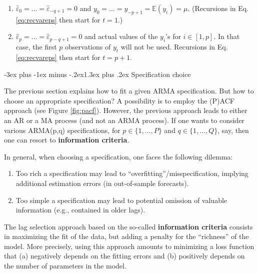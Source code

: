 \documentclass[
  11pt,
]{book}
\makeatletter
\providecommand{\tightlist}{%
  \setlength{\itemsep}{0pt}\setlength{\parskip}{0pt}}
\renewcommand\section{\@startsection{section}{1}{\z@}
  {-3ex plus -1ex minus -.2ex}{1.3ex plus .2ex}
  {\normalfont\Large\bfseries\color{TextbookInk}}}
\theoremstyle{definition}
\theoremstyle{definition}
\theoremstyle{definition}
\theoremstyle{definition}
\theoremstyle{remark}
\makeatother
\begin{document}
\begin{enumerate}
\def\labelenumi{\alph{enumi}.}
\tightlist
\item
  \(\hat\varepsilon_0=\dots=\hat\varepsilon_{-q+1}=0\) and \(y_{0}=\dots=y_{-p+1}=\mathbb{E}(y_i)=\mu\). (Recursions in Eq. \eqref{eq:recvareps} then start for \(t=1\).)
\item
  \(\hat\varepsilon_p=\dots=\hat\varepsilon_{p-q+1}=0\) and actual values of the \(y_{i}\)'s for \(i \in [1,p]\). In that case, the first \(p\) observations of \(y_t\) will not be used. Recursions in Eq. \eqref{eq:recvareps} then start for \(t=p+1\).
\end{enumerate}

\section{Specification choice}\label{specification-choice}

The previous section explains how to fit a given ARMA specification. But how to choose an appropriate specification? A possibility is to employ the (P)ACF approach (see Figure \ref{fig:pacf}). However, the previous approach leads to either an AR or a MA process (and not an ARMA process). If one wants to consider various ARMA(p,q) specifications, for \(p \in \{1,\dots,P\}\) and \(q \in \{1,\dots,Q\}\), say, then one can resort to \textbf{information criteria}.

In general, when choosing a specification, one faces the following dilemma:

\begin{enumerate}
\def\labelenumi{\alph{enumi}.}
\tightlist
\item
  Too rich a specification may lead to ``overfitting''/misspecification, implying additional estimation errors (in out-of-sample forecasts).
\item
  Too simple a specification may lead to potential omission of valuable information (e.g., contained in older lags).
\end{enumerate}

The lag selection approach based on the so-called \textbf{information criteria} consists in maximizing the fit of the data, but adding a penalty for the ``richness'' of the model. More precisely, using this approach amounts to minimizing a loss function that (a) negatively depends on the fitting errors and (b) positively depends on the number of parameters in the model.
\end{document}
